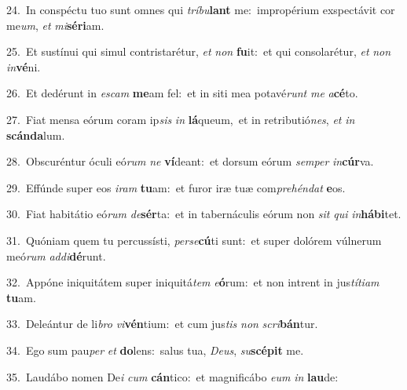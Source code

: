 {\numbfont\textcolor{\numbcolor}{24.}}~In conspéctu tuo sunt omnes qui \textit{trí}\-\textit{bu}\textbf{lant} me:~\star impropérium exspectávit cor me\-\textit{um}\-, \textit{et} \textit{mi}\-\textbf{sé}\textbf{ri}am.\par
{\numbfont\textcolor{\numbcolor}{25.}}~Et sustínui qui simul contristarétur, \textit{et} \textit{non} \textbf{fu}\-it:~\star et qui consolarétur, \textit{et} \textit{non} \textit{in}\-\textbf{vé}ni.\par
{\numbfont\textcolor{\numbcolor}{26.}}~Et dedérunt in \textit{es}\-\textit{cam} \textbf{me}\-am fel:~\star et in siti mea potavé\textit{runt} \textit{me} \textit{a}\-\textbf{cé}to.\par
{\numbfont\textcolor{\numbcolor}{27.}}~Fiat mensa eórum coram ip\textit{sis} \textit{in} \textbf{lá}\-queum,~\star et in retributió\-\textit{nes}\-, \textit{et} \textit{in} \textbf{scán}\-\textbf{da}lum.\par
{\numbfont\textcolor{\numbcolor}{28.}}~Obscuréntur óculi eó\textit{rum} \textit{ne} \textbf{ví}\-deant:~\star et dorsum eórum \textit{sem}\-\textit{per} \textit{in}\-\textbf{cúr}va.\par
{\numbfont\textcolor{\numbcolor}{29.}}~Effúnde super eos \textit{i}\-\textit{ram} \textbf{tu}\-am:~\star et furor iræ tuæ com\-\textit{pre}\-\textit{hén}\textit{dat} \textbf{e}\-os.\par
{\numbfont\textcolor{\numbcolor}{30.}}~Fiat habitátio eó\textit{rum} \textit{de}\-\textbf{sér}ta:~\star et in tabernáculis eórum non \textit{sit} \textit{qui} \textit{in}\-\textbf{há}\textbf{bi}tet.\par
{\numbfont\textcolor{\numbcolor}{31.}}~Quóniam quem tu percussísti, \textit{per}\-\textit{se}\textbf{cú}ti sunt:~\star et super dolórem vúlnerum meó\textit{rum} \textit{ad}\-\textit{di}\textbf{dé}runt.\par
{\numbfont\textcolor{\numbcolor}{32.}}~Appóne iniquitátem super iniquitá\textit{tem} \textit{e}\-\textbf{ó}rum:~\star et non intrent in jus\-\textit{tí}\-\textit{ti}\textit{am} \textbf{tu}\-am.\par
{\numbfont\textcolor{\numbcolor}{33.}}~Deleántur de li\textit{bro} \textit{vi}\-\textbf{vén}tium:~\star et cum jus\textit{tis} \textit{non} \textit{scri}\-\textbf{bán}tur.\par
{\numbfont\textcolor{\numbcolor}{34.}}~Ego sum pau\textit{per} \textit{et} \textbf{do}\-lens:~\star salus tua, \textit{De}\-\textit{us}, \textit{su}\-\textbf{scé}\textbf{pit} me.\par
{\numbfont\textcolor{\numbcolor}{35.}}~Laudábo nomen De\textit{i} \textit{cum} \textbf{cán}\-tico:~\star et magnificábo \textit{e}\-\textit{um} \textit{in} \textbf{lau}\-de:\par
